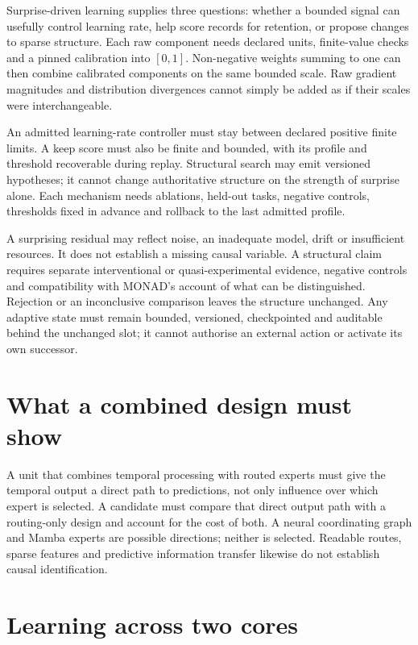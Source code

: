 Surprise-driven learning supplies three questions: whether a bounded signal can usefully control learning rate, help score records for retention, or propose changes to sparse structure. Each raw component needs declared units, finite-value checks and a pinned calibration into $[0,1]$. Non-negative weights summing to one can then combine calibrated components on the same bounded scale. Raw gradient magnitudes and distribution divergences cannot simply be added as if their scales were interchangeable.

An admitted learning-rate controller must stay between declared positive finite limits. A keep score must also be finite and bounded, with its profile and threshold recoverable during replay. Structural search may emit versioned hypotheses; it cannot change authoritative structure on the strength of surprise alone. Each mechanism needs ablations, held-out tasks, negative controls, thresholds fixed in advance and rollback to the last admitted profile.

A surprising residual may reflect noise, an inadequate model, drift or insufficient resources. It does not establish a missing causal variable. A structural claim requires separate interventional or quasi-experimental evidence, negative controls and compatibility with MONAD's account of what can be distinguished. Rejection or an inconclusive comparison leaves the structure unchanged. Any adaptive state must remain bounded, versioned, checkpointed and auditable behind the unchanged slot; it cannot authorise an external action or activate its own successor.

\section{What a combined design must show}

A unit that combines temporal processing with routed experts must give the temporal output a direct path to predictions, not only influence over which expert is selected. A candidate must compare that direct output path with a routing-only design and account for the cost of both. A neural coordinating graph and Mamba experts are possible directions; neither is selected. Readable routes, sparse features and predictive information transfer likewise do not establish causal identification.

\section{Learning across two cores}

